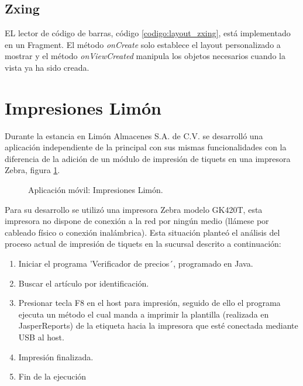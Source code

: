 \subsection{Zxing}
\label{codigo:zxing}
EL lector de código de barras, código \ref{codigo:layout_zxing}, está implementado en un Fragment. El método \textit{onCreate} solo establece el layout personalizado a mostrar y el método \textit{onViewCreated} manipula los objetos necesarios cuando la vista ya ha sido creada.


\section{Impresiones Limón}
Durante la estancia en Limón Almacenes S.A. de C.V. se desarrolló una aplicación independiente de la principal con sus mismas funcionalidades con la diferencia de la adición de un módulo de impresión de tiquets en una impresora Zebra, figura \ref{appsec}.

\begin{figure}[!h]
	\centering
	\caption{Aplicación móvil: Impresiones Limón.}
	\label{appsec}
\end{figure}

Para su desarrollo se utilizó una impresora Zebra modelo GK420T, esta impresora no dispone de conexión a la red por ningún medio (llámese por cableado físico o conexión inalámbrica). Esta situación planteó el análisis del proceso actual de impresión de tiquets en la sucursal descrito a continuación:

\begin{enumerate}
	\item Iniciar el programa 'Verificador de precios´, programado en Java.
	\item Buscar el artículo por identificación.
	\item Presionar tecla F8 en el host para impresión, seguido de ello el programa ejecuta un método el cual manda a imprimir la plantilla (realizada en JasperReports) de la etiqueta hacia la impresora que esté conectada mediante USB al host.
	\item Impresión finalizada.
	\item Fin de la ejecución
\end{enumerate}

